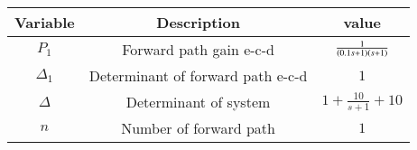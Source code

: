     \begin{tabular}{|c|c|c|} 
    \hline
\textbf{Variable}& \textbf{Description} & \textbf{value}\\\hline
    $P_{1}$& Forward path gain e-c-d & $\frac{1}{\left(0.1s+1\right)\left(s+1\right)}$\\\hline
    $\Delta_{1}$&Determinant of forward path e-c-d & $1$\\\hline
    $\Delta$& Determinant of system & $1+\frac{10}{s+1}+10$\\\hline
    $n$& Number of forward path & $1$\\\hline
    \end{tabular}
